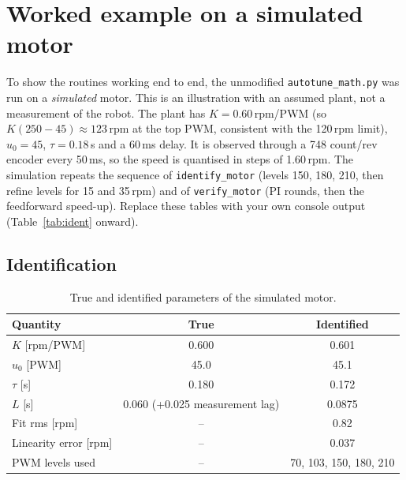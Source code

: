 \documentclass[11pt,a4paper]{report}
\newcommand{\code}[1]{\texttt{#1}}
\begin{document}
\section{Worked example on a simulated motor}\label{sec:mathsim}
To show the routines working end to end, the unmodified \code{autotune\_math.py} was run on a \emph{simulated} motor. This is an illustration with an assumed plant, not a measurement of the robot. The plant has $K=0.60$\,rpm/PWM (so $K(250-45)\approx123$\,rpm at the top PWM, consistent with the 120\,rpm limit), $u_0=45$, $\tau=0.18$\,s and a 60\,ms delay. It is observed through a 748 count/rev encoder every 50\,ms, so the speed is quantised in steps of 1.60\,rpm. The simulation repeats the sequence of \code{identify\_motor} (levels 150, 180, 210, then refine levels for 15 and 35\,rpm) and of \code{verify\_motor} (PI rounds, then the feedforward speed-up). Replace these tables with your own console output (Table~\ref{tab:ident} onward).

\subsection{Identification}
\begin{table}[H]
\centering
\caption{True and identified parameters of the simulated motor.}
\small
\begin{tabular}{@{}lcc@{}}
\toprule
Quantity & True & Identified\\
\midrule
$K$ [rpm/PWM] & 0.600 & 0.601\\
$u_0$ [PWM] & 45.0 & 45.1\\
$\tau$ [s] & 0.180 & 0.172\\
$L$ [s] & 0.060 (+0.025 measurement lag) & 0.0875\\
Fit rms [rpm] & -- & 0.82\\
Linearity error [rpm] & -- & 0.037\\
PWM levels used & -- & 70, 103, 150, 180, 210\\
\bottomrule
\end{tabular}
\end{table}
\end{document}
